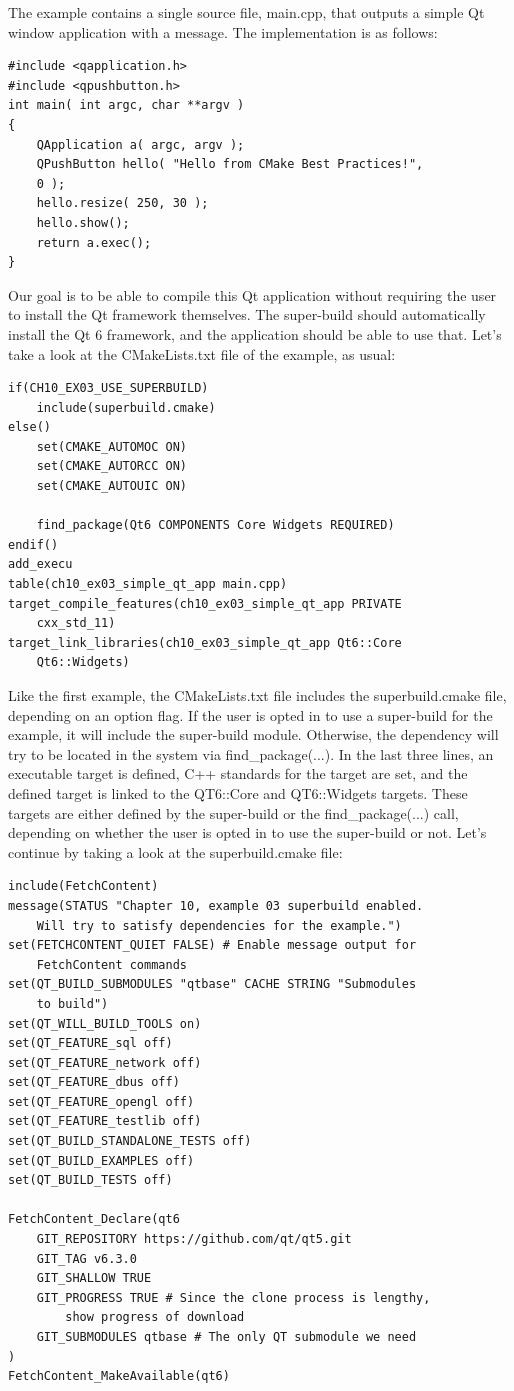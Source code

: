 The example contains a single source file, main.cpp, that outputs a simple Qt window application with a message. The implementation is as follows:

\begin{lstlisting}[style=styleCXX]
#include <qapplication.h>
#include <qpushbutton.h>
int main( int argc, char **argv )
{
	QApplication a( argc, argv );
	QPushButton hello( "Hello from CMake Best Practices!",
	0 );
	hello.resize( 250, 30 );
	hello.show();
	return a.exec();
}
\end{lstlisting}

Our goal is to be able to compile this Qt application without requiring the user to install the Qt framework themselves. The super-build should automatically install the Qt 6 framework, and the application should be able to use that. Let's take a look at the CMakeLists.txt file of the example, as usual:

\begin{lstlisting}[style=styleCMake]
if(CH10_EX03_USE_SUPERBUILD)
	include(superbuild.cmake)
else()
	set(CMAKE_AUTOMOC ON)
	set(CMAKE_AUTORCC ON)
	set(CMAKE_AUTOUIC ON)

	find_package(Qt6 COMPONENTS Core Widgets REQUIRED)
endif()
add_execu
table(ch10_ex03_simple_qt_app main.cpp)
target_compile_features(ch10_ex03_simple_qt_app PRIVATE
	cxx_std_11)
target_link_libraries(ch10_ex03_simple_qt_app Qt6::Core
	Qt6::Widgets)
\end{lstlisting}

Like the first example, the CMakeLists.txt file includes the superbuild.cmake file, depending on an option flag. If the user is opted in to use a super-build for the example, it will include the super-build module. Otherwise, the dependency will try to be located in the system via find\_package(...). In the last three lines, an executable target is defined, C++ standards for the target are set, and the defined target is linked to the QT6::Core and QT6::Widgets targets. These targets are either defined by the super-build or the find\_package(...) call, depending on whether the user is opted in to use the super-build or not. Let's continue by taking a look at the superbuild.cmake file:

\begin{lstlisting}[style=styleCMake]
include(FetchContent)
message(STATUS "Chapter 10, example 03 superbuild enabled.
	Will try to satisfy dependencies for the example.")
set(FETCHCONTENT_QUIET FALSE) # Enable message output for
	FetchContent commands
set(QT_BUILD_SUBMODULES "qtbase" CACHE STRING "Submodules
	to build")
set(QT_WILL_BUILD_TOOLS on)
set(QT_FEATURE_sql off)
set(QT_FEATURE_network off)
set(QT_FEATURE_dbus off)
set(QT_FEATURE_opengl off)
set(QT_FEATURE_testlib off)
set(QT_BUILD_STANDALONE_TESTS off)
set(QT_BUILD_EXAMPLES off)
set(QT_BUILD_TESTS off)

FetchContent_Declare(qt6
	GIT_REPOSITORY https://github.com/qt/qt5.git
	GIT_TAG v6.3.0
	GIT_SHALLOW TRUE
	GIT_PROGRESS TRUE # Since the clone process is lengthy,
		show progress of download
	GIT_SUBMODULES qtbase # The only QT submodule we need
)
FetchContent_MakeAvailable(qt6)
\end{lstlisting}

